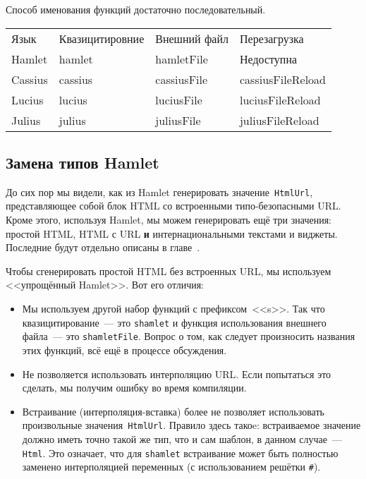 Способ именования функций достаточно последовательный.

\begin{tabular}{l l l l}
Язык    & Квазицитировние & Внешний файл & Перезагрузка \\
Hamlet  & hamlet           & hamletFile   & Недоступна    \\
Cassius & cassius          & cassiusFile  & cassiusFileReload \\
Lucius  & lucius           & luciusFile   & luciusFileReload \\
Julius  & julius           & juliusFile   & juliusFileReload \\
\end{tabular}

\subsection{Замена типов Hamlet}
До сих пор мы видели, как из Hamlet генерировать значение~\lstinline'HtmlUrl',
представляющее собой блок HTML со встроенными типо-безопасными URL. Кроме
этого, используя Hamlet, мы можем генерировать ещё три значения: простой HTML,
HTML с URL \textbf{и} интернациональными текстами и виджеты. Последние будут
отдельно описаны в главе~.

Чтобы сгенерировать простой HTML без встроенных URL, мы используем
<<упрощённый Hamlet>>. Вот его отличия:
\begin{itemize}
    \item Мы используем другой набор функций с префиксом~<<s>>. Так что
        квазицитирование~--- это \texttt{shamlet} и функция использования
        внешнего файла~--- это \texttt{shamletFile}. Вопрос о том, как следует
        произносить названия этих функций, всё ещё в процессе обсуждения.

    \item Не позволяется использовать интерполяцию URL. Если попытаться это
        сделать, мы получим ошибку во время компиляции.

    \item Встраивание (интерполяция-вставка) более не позволяет использовать
        произвольные значения~\lstinline'HtmlUrl'. Правило здесь такоe: встраиваемое
        значение должно иметь точно такой же тип, что и сам шаблон, в
        данном случае~--- \lstinline'Html'. Это означает, что для
        \texttt{shamlet} встраивание может быть полностью заменено
        интерполяцией переменных (с использованием решётки \texttt{\#}).
\end{itemize}

